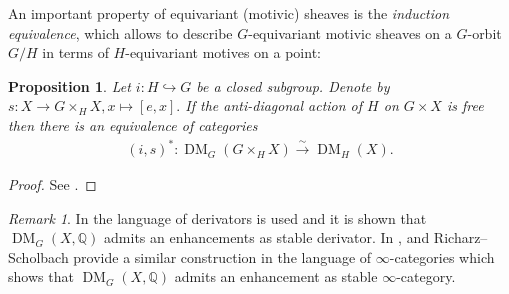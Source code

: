 \documentclass{amsart}
\theoremstyle{plain}
\newtheorem{proposition}[theorem]{Proposition}
\theoremstyle{TheoremNum}
\theoremstyle{definition}
\theoremstyle{remark}
\newtheorem{remark}[theorem]{Remark}
\numberwithin{equation}{section}
\newcommand{\Q}{\mathbb{Q}}
\newcommand{\DM}{\operatorname{DM}}
\begin{document}
An important property of equivariant (motivic) sheaves is the \emph{induction equivalence}, which allows to describe $G$-equivariant motivic sheaves on a $G$-orbit $G/H$ in terms of $H$-equivariant motives on a point:
\begin{proposition}
Let $i:H\hookrightarrow G$ be a closed subgroup. Denote by $s:X\to G\times_H X, x\mapsto [e,x].$ If the anti-diagonal action of $H$ on $G\times X$ is free then there is an equivalence of categories
\begin{align}
    (i,s)^*:\DM_G(G\times_H X)\stackrel{\sim}{\to}\DM_H(X).\label{eq:inductionequivalence}
\end{align}
\end{proposition}
\begin{proof}
See \cite[Proposition I.7.4]{soergel_equivariant_2018}.
\end{proof}
\begin{remark}
In \cite{soergel_equivariant_2018} the language of derivators is used and it is shown that $\DM_G(X,\Q)$ admits an enhancements as stable derivator. In \cite{richarz_intersection_2020}, \cite{richarz_motivic_2021} and \cite{richarz_tate_2021} Richarz--Scholbach provide a similar construction in the language of $\infty$-categories which shows that $\DM_G(X,\Q)$ admits an enhancement as stable $\infty$-category.
\end{remark}
\end{document}
